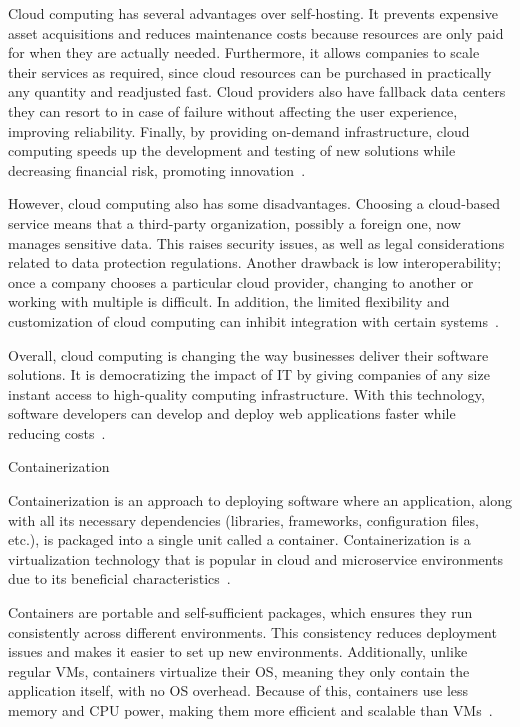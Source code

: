 \documentclass[12pt,reqno, oneside]{amsbook}
\makeatletter
\def\section{\@startsection{section}{1}%
      \z@{.5\linespacing\@plus.7\linespacing}{.25\linespacing}%
      {\normalfont\bfseries\flushleft}}
\theoremstyle{definition}
\theoremstyle{definition}
\numberwithin{section}{chapter}
\numberwithin{table}{chapter}
\numberwithin{figure}{chapter}
\makeatother
\begin{document}
Cloud computing has several advantages over self-hosting. It prevents expensive asset acquisitions and reduces maintenance costs because resources are only paid for when they are actually needed. Furthermore, it allows companies to scale their services as required, since cloud resources can be purchased in practically any quantity and readjusted fast. Cloud providers also have fallback data centers they can resort to in case of failure without affecting the user experience, improving reliability. Finally, by providing on-demand infrastructure, cloud computing speeds up the development and testing of new solutions while decreasing financial risk, promoting innovation~\cite{Figueira2024, Nordic2012, Alam2020, Nadeem2024, Villamizar2016}.

However, cloud computing also has some disadvantages. Choosing a cloud-based service means that a third-party organization, possibly a foreign one, now manages sensitive data. This raises security issues, as well as legal considerations related to data protection regulations. Another drawback is low interoperability; once a company chooses a particular cloud provider, changing to another or working with multiple is difficult. In addition, the limited flexibility and customization of cloud computing can inhibit integration with certain systems~\cite{Nordic2012, Alam2020}.

Overall, cloud computing is changing the way businesses deliver their software solutions. It is democratizing the impact of \ac{IT} by giving companies of any size instant access to high-quality computing infrastructure. With this technology, software developers can develop and deploy web applications faster while reducing costs~\cite{Figueira2024, Berry2021, Nadeem2024}.

\section{Containerization}

Containerization is an approach to deploying software where an application, along with all its necessary dependencies (libraries, frameworks, configuration files, etc.), is packaged into a single unit called a container. Containerization is a virtualization technology that is popular in cloud and microservice environments due to its beneficial characteristics~\cite{Figueira2024, Hardikar2021, Potdar2020}.

Containers are portable and self-sufficient packages, which ensures they run consistently across different environments. This consistency reduces deployment issues and makes it easier to set up new environments. Additionally, unlike regular \acp{VM}, containers virtualize their \ac{OS}, meaning they only contain the application itself, with no \ac{OS} overhead. Because of this, containers use less memory and \ac{CPU} power, making them more efficient and scalable than \acp{VM}~\cite{Figueira2024, Hardikar2021, Potdar2020}.
\end{document}
